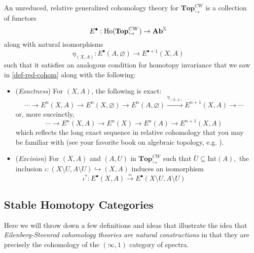 \documentclass[12pt]{article}
\newcommand*{\relCW}{\mathbf{Top}^{CW}_{\hookrightarrow}}
\begin{document}
\begin{defn}
	An unreduced, relative generalized cohomology theory for $\relCW$ is a collection of functors 
	\[E^\bullet:\text{Ho}(\relCW)\to\Ab^\bbZ\]
	along with natural isomorphisms
	\[\eta_{(X,A)}:E^\bullet(A,\varnothing)\to E^{\bullet+1}(X,A)\]
	such that it satisfies an analogous condition for homotopy invariance that we saw in \ref{def-red-cohom} along with 
	the following: 
	\begin{itemize}
		\item (\textit{Exactness}) For $(X,A)$, the following is exact:
		\[\cdots\to E^n(X,A)\to E^n(X,\varnothing)\to E^n(A,\varnothing)\xrightarrow{\eta_{(X,A)}}E^{n+1}(X,A)\to\cdots\]
		or, more succinctly,
		\[\cdots\to E^n(X,A)\to E^n(X)\to E^n(A)\to E^{n+1}(X,A)\]
		which reflects the long exact sequence in relative cohomology that you may be familiar with (see your favorite book on algebraic topology, e.g.
		\cite[p.199]{hatcher}).
		\item (\textit{Excision}) For $(X,A)$ and $(A,U)$ in $\relCW$ such that $\overline{U}\subseteq \text{Int}(A),$ the
		inclusion $\iota:(X\setminus U,A\setminus U)\hookrightarrow (X,A)$ induces an isomorphism
		\[\iota^\ast:E^\bullet(X,A)\xrightarrow{\simeq}E^\bullet(X\setminus U,A\setminus U)\]
	\end{itemize}
\end{defn}

\subsection{Stable Homotopy Categories}
Here we will throw down a few definitions and ideas that illustrate the idea that \textit{Eilenberg-Steenrod cohomology theories are 
natural constructions} in that they are precisely the cohomology of the $(\infty,1)$ category of spectra.
\end{document}
